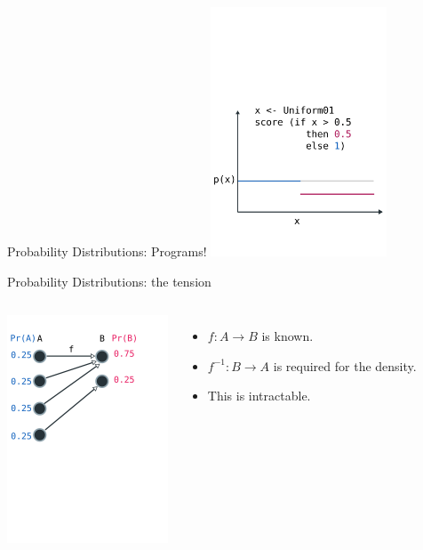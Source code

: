 \documentclass{beamer}
\begin{document}
\begin{frame}[fragile]{Probability Distributions: Programs!}
    \includegraphics[height=280px]{res/MCMC-1.pdf}
\end{frame}

\begin{frame}[fragile]{Probability Distributions: the tension}
    \begin{columns}
        \includegraphics[height=256px]{res/density-forward.pdf}
        \begin{itemize}
            \item $f: A \rightarrow B$ is known.
            \item $f^{-1}: B \rightarrow A$ is required for the density.
            \item This is intractable.
        \end{itemize}
    \end{columns}
\end{frame}
\end{document}
